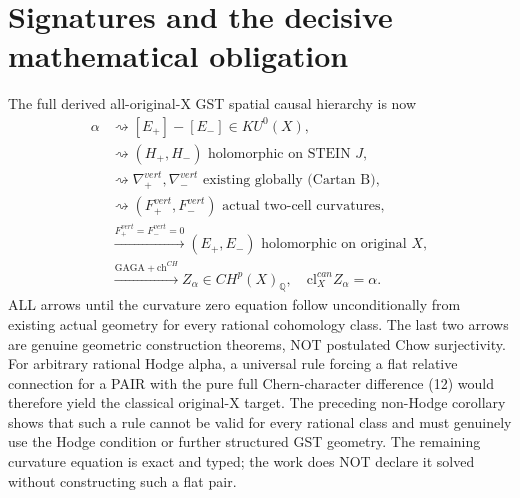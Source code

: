 \documentclass[11pt]{article}
\begin{document}
\section{Signatures and the decisive mathematical obligation}
The full derived all-original-X
GST spatial causal hierarchy is now
\[
 \boxed{
 \begin{aligned}
  \alpha &\rightsquigarrow
    [E_+]-[E_-]\in KU^0(X),\\
  &\rightsquigarrow
   (H_+,H_-)\text{ holomorphic on STEIN }J,\\
  &\rightsquigarrow
    \nabla^{vert}_+,\nabla^{vert}_-
       \text{ existing globally (Cartan B)},\\
  &\rightsquigarrow
     (F^{vert}_+,F^{vert}_-)\text{ actual two-cell curvatures},\\
  &\xrightarrow{F^{vert}_+=F^{vert}_-=0}
    (E_+,E_-)\text{ holomorphic on original }X,\\
  &\xrightarrow{\mathrm{GAGA}+\mathrm{ch}^{CH}}
    Z_\alpha\in CH^p(X)_{\mathbb Q},
   \quad \mathrm{cl}^{can}_X Z_\alpha=\alpha .
 \end{aligned}
 }                                                       \tag{19}
\]
ALL arrows until the curvature
zero equation follow unconditionally
from existing actual geometry for
every rational cohomology class.
The last two arrows are genuine
geometric construction theorems,
NOT postulated Chow surjectivity.
For arbitrary rational Hodge alpha,
a universal rule forcing a flat
relative connection for a PAIR
with the pure full Chern-character
difference (12) would therefore
yield the classical original-X target.
The preceding non-Hodge corollary
shows that such a rule cannot be
valid for every rational class and
must genuinely use the Hodge
condition or further structured
GST geometry. The remaining
curvature equation is exact and
typed; the work does NOT declare
it solved without constructing
such a flat pair.
\end{document}
